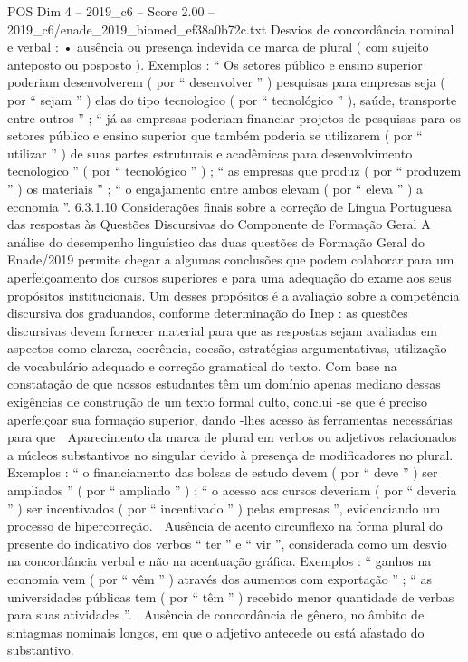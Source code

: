 \begin{textsample}{POS Dim 4 – 2019\_c6 – Score 2.00 – 2019\_c6/enade\_2019\_biomed\_ef38a0b72c.txt}
Desvios de concordância nominal e verbal : • ausência ou presença indevida de marca de plural ( com sujeito anteposto ou posposto ).
Exemplos : “ Os setores público e ensino superior poderiam desenvolverem ( por “ desenvolver ” ) pesquisas para empresas seja ( por “ sejam ” ) elas do tipo tecnologico ( por “ tecnológico ” ), saúde, transporte entre outros ” ; “ já as empresas poderiam financiar projetos de pesquisas para os setores público e ensino superior que também poderia se utilizarem ( por “ utilizar ” ) de suas partes estruturais e acadêmicas para desenvolvimento tecnologico ” ( por “ tecnológico ” ) ; “ as empresas que produz ( por “ produzem ” ) os materiais ” ; “ o engajamento entre ambos elevam ( por “ eleva ” ) a economia ”. 6.3.1.10 Considerações finais sobre a correção de Língua Portuguesa das respostas às Questões Discursivas do Componente de Formação Geral A análise do desempenho linguístico das duas questões de Formação Geral do Enade/2019 permite chegar a algumas conclusões que podem colaborar para um aperfeiçoamento dos cursos superiores e para uma adequação do exame aos seus propósitos institucionais.
Um desses propósitos é a avaliação sobre a competência discursiva dos graduandos, conforme determinação do Inep : as questões discursivas devem fornecer material para que as respostas sejam avaliadas em aspectos como clareza, coerência, coesão, estratégias argumentativas, utilização de vocabulário adequado e correção gramatical do texto.
Com base na constatação de que nossos estudantes têm um domínio apenas mediano dessas exigências de construção de um texto formal culto, conclui -se que é preciso aperfeiçoar sua formação superior, dando -lhes acesso às ferramentas necessárias para que  Aparecimento da marca de plural em verbos ou adjetivos relacionados a núcleos substantivos no singular devido à presença de modificadores no plural.
Exemplos : “ o financiamento das bolsas de estudo devem ( por “ deve ” ) ser ampliados ” ( por “ ampliado ” ) ; “ o acesso aos cursos deveriam ( por “ deveria ” ) ser incentivados ( por “ incentivado ” ) pelas empresas ”, evidenciando um processo de hipercorreção.  Ausência de acento circunflexo na forma plural do presente do indicativo dos verbos “ ter ” e “ vir ”, considerada como um desvio na concordância verbal e não na acentuação gráfica.
Exemplos : “ ganhos na economia vem ( por “ vêm ” ) através dos aumentos com exportação ” ; “ as universidades públicas tem ( por “ têm ” ) recebido menor quantidade de verbas para suas atividades ”.  Ausência de concordância de gênero, no âmbito de sintagmas nominais longos, em que o adjetivo antecede ou está afastado do substantivo.

\end{textsample}
